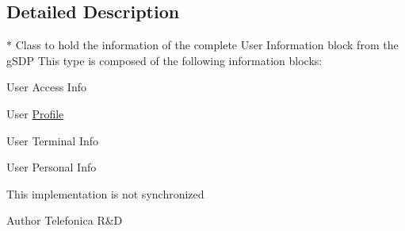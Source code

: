 \subsection{Detailed Description}
$\ast$ Class to hold the information of the complete User Information block from the gSDP This type is composed of the following information blocks: 
\begin{DoxyItemize}
\item User Access Info 
\item User \hyperlink{classcom_1_1bluevia_1_1directory_1_1data_1_1Profile}{Profile} 
\item User Terminal Info 
\item User Personal Info 
\end{DoxyItemize}

This implementation is not synchronized \begin{DoxyAuthor}{Author}
Telefonica R\&D 
\end{DoxyAuthor}


